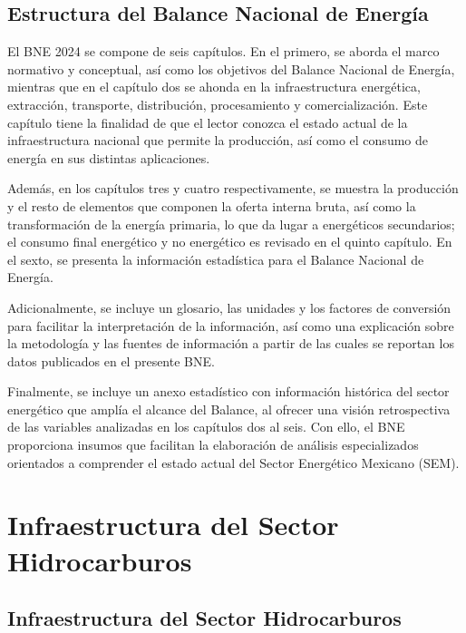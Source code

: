 \documentclass{sener2025}
\begin{document}
\subsection{ Estructura del Balance Nacional de Energía}

El BNE 2024 se compone de seis capítulos. En el primero, se aborda el marco normativo y conceptual, así como los objetivos del Balance Nacional de Energía, mientras que en el capítulo dos se ahonda en la infraestructura energética, extracción, transporte, distribución, procesamiento y comercialización. Este capítulo tiene la finalidad de que el lector conozca el estado actual de la infraestructura nacional que permite la producción, así como el consumo de energía en sus distintas aplicaciones.

Además, en los capítulos tres y cuatro respectivamente, se muestra la producción y el resto de elementos que componen la oferta interna bruta, así como la transformación de la energía primaria, lo que da lugar a energéticos secundarios; el consumo final energético y no energético es revisado en el quinto capítulo. En el sexto, se presenta la información estadística para el Balance Nacional de Energía.

Adicionalmente, se incluye un glosario, las unidades y los factores de conversión para facilitar la interpretación de la información, así como una explicación sobre la metodología y las fuentes de información a partir de las cuales se reportan los datos publicados en el presente BNE.

Finalmente, se incluye un anexo estadístico con información histórica del sector energético que amplía el alcance del Balance, al ofrecer una visión retrospectiva de las variables analizadas en los capítulos dos al seis. Con ello, el BNE proporciona insumos que facilitan la elaboración de análisis especializados orientados a comprender el estado actual del Sector Energético Mexicano (SEM).



\section{Infraestructura del Sector Hidrocarburos}




\subsection{Infraestructura del Sector Hidrocarburos}
\end{document}
